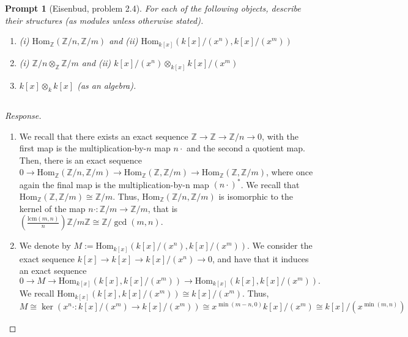 \documentclass[english]{article}
\newcommand{\ZZ}{\mathbb{Z}}
\newcommand{\prob}[1]{\setcounter{section}{#1-1}\section{}}
\newcommand{\prt}[1]{\setcounter{subsection}{#1-1}\subsection{}}
\newtheorem*{prompt*}{Prompt}
\theoremstyle{remark}
\theoremstyle{definition}
\newcommand{\lcm}{\mathrm{lcm}}
\renewcommand{\hom}{\mathrm{Hom}}
\begin{document}
\prob{4}
\begin{prompt*}[Eisenbud, problem 2.4]
	For each of the following objects, describe their structures (as modules unless otherwise stated).
	\begin{enumerate}[label=\textbf{\alph*.)}]
		\item \emph{(i)} $\hom_\ZZ\left(\ZZ/n,\ZZ/m\right)$ and \emph{(ii)} $\hom_{k[x]}\left(k[x]/(x^n),k[x]/(x^m)\right)$
		\item\emph{(i)} $\ZZ/n\otimes_{\ZZ}\ZZ/m$ and \emph{(ii)} $k[x]/(x^n)\otimes_{k[x]}k[x]/(x^m)$
	    \item $k[x]\otimes_k k[x]$ (as an algebra).
	\end{enumerate}
\end{prompt*}
\prt{1}
\begin{proof}[Response]~
	\begin{enumerate}[label=\emph{(\roman*)}]
		\item We recall that there exists an exact sequence $\ZZ\to\ZZ\to\ZZ/n\to 0$, with the first map is the multiplication-by-$n$ map $n\cdot$ and the second a quotient map. Then, there is an exact sequence $0\to \hom_{\ZZ}(\ZZ/n,\ZZ/m)\to \hom_{\ZZ}(\ZZ,\ZZ/m) \to \hom_{\ZZ}(\ZZ,\ZZ/m)$, where once again the final map is the multiplication-by-n map $(n\cdot)^*$. We recall that $\hom_{\ZZ}(\ZZ,\ZZ/m)\cong \ZZ/m$. Thus, $\hom_{\ZZ}(\ZZ/n,\ZZ/m)$ is isomorphic to the kernel of the map $n\cdot: \ZZ/m\to\ZZ/m$, that is $(\frac{\lcm(m,n)}{n})\ZZ/m\ZZ\cong \ZZ/\gcd(m,n)$.
		 
		\item We denote by $M:=\hom_{k[x]}\left(k[x]/(x^n),k[x]/(x^m)\right)$. We consider the exact sequence $k[x]\to k[x]\to k[x]/(x^n)\to 0$, and have that it induces an exact sequence
		$$0\to M\to\hom_{k[x]}\left(k[x],k[x]/(x^m)\right)\to \hom_{k[x]}\left(k[x],k[x]/(x^m)\right).$$ We recall $\hom_{k[x]}\left(k[x],k[x]/(x^m)\right)\cong k[x]/(x^m)$.
		Thus, $M\cong \ker\left(x^n\cdot:k[x]/(x^m)\to k[x]/(x^m)\right)\cong x^{\min(m-n,0)}k[x]/(x^m)\cong k[x]/(x^{\min(m,n)})$
		\end{enumerate}
\end{proof}
\prt{2}
\end{document}
